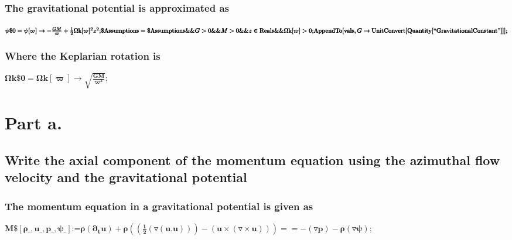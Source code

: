 \documentclass{article}
\begin{document}
\subsubsection*{The gravitational potential is approximated as}

\begin{doublespace}
\noindent\(\pmb{\text{$\psi \$$0} = \psi [\varpi ] \to  -\frac{G M}{\varpi }+\frac{1}{2}\text{$\Omega $k}[\varpi ]^2z^2;}\\
\pmb{\text{$\$$Assumptions} = \text{$\$$Assumptions} \&\& G > 0 \&\& M >0 \&\& z \in  \text{Reals} \&\& \text{$\Omega $k}[\varpi ] > 0;}\\
\pmb{\text{AppendTo}[\text{vals}, G\to  \text{UnitConvert}[\text{Quantity}[\text{{``}GravitationalConstant{''}}]] ];}\)
\end{doublespace}

\subsubsection*{Where the Keplarian rotation is}

\begin{doublespace}
\noindent\(\pmb{\text{$\Omega $k$\$$0} = \text{$\Omega $k}[\varpi ]\to \sqrt{\frac{G M}{\varpi ^3}};}\)
\end{doublespace}

\section*{Part a.}

\subsection*{Write the axial component of the momentum equation using the azimuthal flow velocity and the gravitational potential}

\subsubsection*{The momentum equation in a gravitational potential is given as}

\begin{doublespace}
\noindent\(\pmb{\text{M$\$$}[\rho \_,\text{u$\_$},\text{p$\_$},\psi \_] \text{:=} \rho \left(\partial _tu\right) + \rho  \left(\left(\frac{1}{2}(\triangledown
(u.u))\right)-(u\times (\triangledown \times u))\right)== -(\triangledown  p)-\rho  (\triangledown  \psi );}\)
\end{doublespace}
\end{document}
